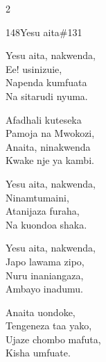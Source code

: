 \documentclass{article}
\begin{document}
\begin{multicols}{2}
\begin{hymn}{148}{Yesu aita}{\#131}
\begin{stanza}
Yesu aita, nakwenda,\\
Ee! usinizuie,\\
Napenda kumfuata\\
Na sitarudi nyuma.
\end{stanza}
\begin{chorus}
Afadhali kuteseka\\
Pamoja na Mwokozi,\\
Anaita, ninakwenda\\
Kwake nje ya kambi.
\end{chorus}
\begin{stanza}
Yesu aita, nakwenda,\\
Ninamtumaini,\\
Atanijaza furaha,\\
Na kuondoa shaka.
\end{stanza}
\begin{stanza}
Yesu aita, nakwenda,\\
Japo lawama zipo,\\
Nuru inaniangaza,\\
Ambayo inadumu.
\end{stanza}
\begin{stanza}
Anaita uondoke,\\
Tengeneza taa yako,\\
Ujaze chombo mafuta,\\
Kisha umfuate.
\end{stanza}
\end{hymn}


\end{multicols}
\end{document}
